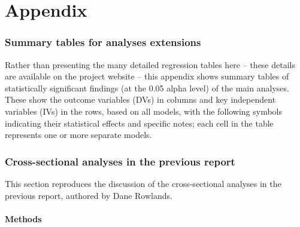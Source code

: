 \documentclass[12pt]{article}
\begin{document}
\clearpage
\appendix
\part*{Appendix}
\label{appendix}

\section{Summary tables for analyses extensions}
\label{appendix_tables}

Rather than presenting the many detailed regression tables here -- these details are available on the project website -- this appendix shows summary tables of statistically significant findings (at the 0.05 alpha level) of the main analyses. These show the outcome variables (DVs) in columns and key independent variables (IVs) in the rows, based on all models, with the following symbols indicating their statistical effects and specific notes; each cell in the table represents one or more separate models.








\section{Cross-sectional analyses in the previous report}
\label{appendix_cs_dane}

This section reproduces the discussion of the cross-sectional analyses in the previous report, authored by Dane Rowlands.

\subsection{Methods}
\end{document}
